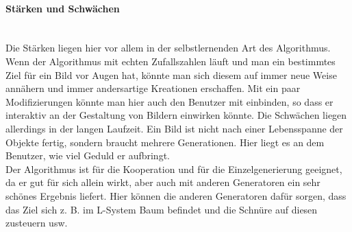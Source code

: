 \documentclass[../mciAusarbeitung.tex]{subfiles}
\begin{document}
		\paragraph{Stärken und Schwächen}$~$\\
		Die Stärken liegen hier vor allem in der selbstlernenden Art des Algorithmus. Wenn der Algorithmus mit echten Zufallszahlen läuft und man ein bestimmtes Ziel für ein Bild vor Augen hat, könnte man sich diesem auf immer neue Weise annähern und immer andersartige Kreationen erschaffen. Mit ein paar Modifizierungen könnte man hier auch den Benutzer mit einbinden, so dass er interaktiv an der Gestaltung von Bildern einwirken könnte.
		Die Schwächen liegen allerdings in der langen Laufzeit. Ein Bild ist nicht nach einer Lebensspanne der Objekte fertig, sondern braucht mehrere Generationen. Hier liegt es an dem Benutzer, wie viel Geduld er aufbringt.\\
		Der Algorithmus ist für die Kooperation und für die Einzelgenerierung geeignet, da er gut für sich allein wirkt, aber auch mit anderen Generatoren ein sehr schönes Ergebnis liefert. Hier können die anderen Generatoren dafür sorgen, dass das Ziel sich z. B. im L-System Baum befindet und die Schnüre auf diesen zusteuern usw.\\
		
\end{document}
